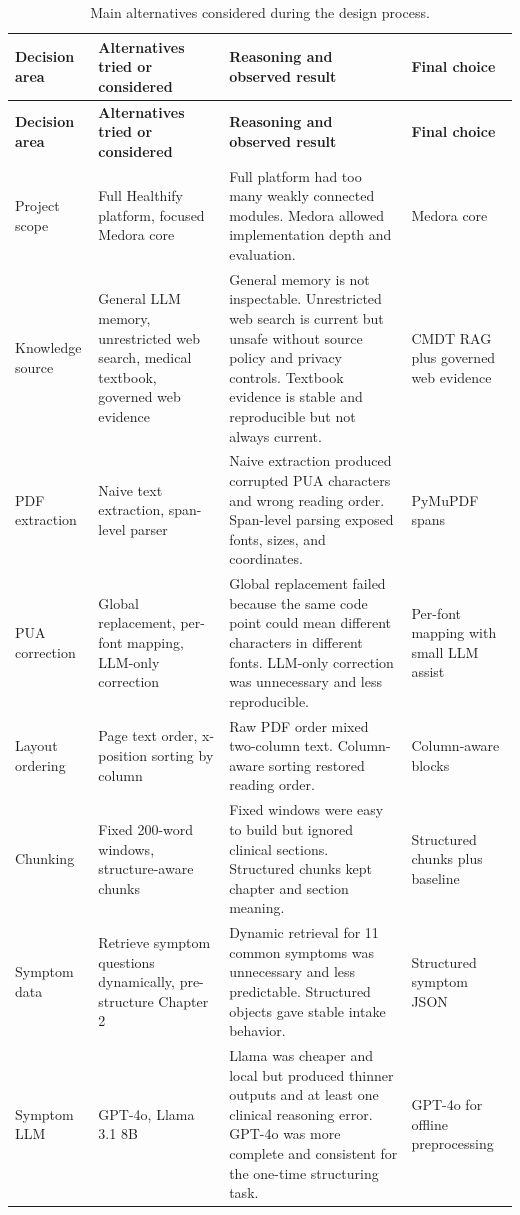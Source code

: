 \begin{longtable}{p{} p{} p{} p{}}
\caption{Main alternatives considered during the design process.}
\label{tab:design_alternatives}\\
\toprule
\textbf{Decision area} & \textbf{Alternatives tried or considered} & \textbf{Reasoning and observed result} & \textbf{Final choice}\\
\midrule
\endfirsthead
\toprule
\textbf{Decision area} & \textbf{Alternatives tried or considered} & \textbf{Reasoning and observed result} & \textbf{Final choice}\\
\midrule
\endhead
Project scope & Full Healthify platform, focused Medora core & Full platform had too many weakly connected modules. Medora allowed implementation depth and evaluation. & Medora core\\
Knowledge source & General LLM memory, unrestricted web search, medical textbook, governed web evidence & General memory is not inspectable. Unrestricted web search is current but unsafe without source policy and privacy controls. Textbook evidence is stable and reproducible but not always current. & CMDT RAG plus governed web evidence\\
PDF extraction & Naive text extraction, span-level parser & Naive extraction produced corrupted PUA characters and wrong reading order. Span-level parsing exposed fonts, sizes, and coordinates. & PyMuPDF spans\\
PUA correction & Global replacement, per-font mapping, LLM-only correction & Global replacement failed because the same code point could mean different characters in different fonts. LLM-only correction was unnecessary and less reproducible. & Per-font mapping with small LLM assist\\
Layout ordering & Page text order, x-position sorting by column & Raw PDF order mixed two-column text. Column-aware sorting restored reading order. & Column-aware blocks\\
Chunking & Fixed 200-word windows, structure-aware chunks & Fixed windows were easy to build but ignored clinical sections. Structured chunks kept chapter and section meaning. & Structured chunks plus baseline\\
Symptom data & Retrieve symptom questions dynamically, pre-structure Chapter 2 & Dynamic retrieval for 11 common symptoms was unnecessary and less predictable. Structured objects gave stable intake behavior. & Structured symptom JSON\\
Symptom LLM & GPT-4o, Llama 3.1 8B & Llama was cheaper and local but produced thinner outputs and at least one clinical reasoning error. GPT-4o was more complete and consistent for the one-time structuring task. & GPT-4o for offline preprocessing\\

\end{longtable}
